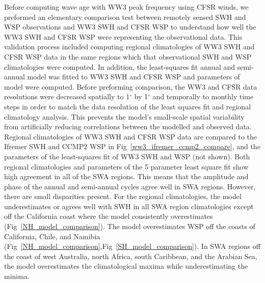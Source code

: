 \documentclass[12pt,twoside]{article}
\begin{document}
Before computing wave age with WW3 peak frequency using CFSR winds, we preformed an elementary comparison test between remotely sensed SWH and WSP observations and WW3 SWH and CFSR WSP to understand how well the WW3 SWH and CFSR WSP were representing the observational data. This validation process included computing regional climatologies of WW3 SWH and CFSR WSP data in the same regions which that observational SWH and WSP climatologies were computed. In addition, the least-squares fit annual and semi-annual model was fitted to WW3 SWH and CFSR WSP and parameters of model were computed. Before preforming comparison, the WW3 and CFSR data resolutions were decreased spatially to 1$^{\circ}$ by 1$^{\circ}$ and temporally to monthly time steps in order to match the data resolution of the least squares fit and regional climatology analysis. This prevents the model's small-scale spatial variability from artificially reducing correlations between the modelled and observed data. Regional climatologies of WW3 SWH and CFSR WSP data are compared to the Ifremer SWH and CCMP2 WSP in Fig~\ref{ww3_ifremer_ccmp2_compare}, and the parameters  of the least-squares fit of WW3 SWH and WSP (not shown). Both regional climatologies and parameters of the 5 parameter least square fit show high agreement in all of the SWA regions. This means that the amplitude and phase of the annual and semi-annual cycles agree well in SWA regions. However, there are small disparities present. For the regional climatologies, the model underestimates or agrees well with SWH in all SWA region climatologies except off the California coast where the model consistently overestimates (Fig~\ref{NH_model_comparison}). The model overestimates WSP off the coasts of California, Chile, and Namibia (Fig~\ref{NH_model_comparison},Fig~\ref{SH_model_comparison}). In SWA regions off the coast of west Australia, north Africa, south Caribbean, and the Arabian Sea, the model overestimates the climatological maxima while underestimating the minima. 
\end{document}
